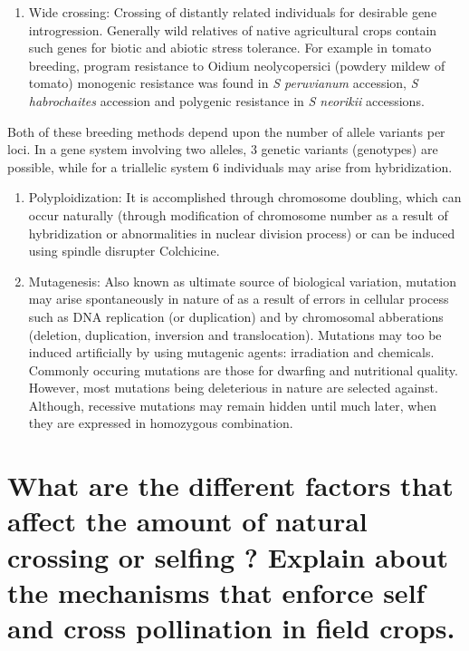 \documentclass[
]{book}
\providecommand{\tightlist}{%
  \setlength{\itemsep}{0pt}\setlength{\parskip}{0pt}}
\begin{document}
\begin{enumerate}
\def\labelenumi{\arabic{enumi}.}
\setcounter{enumi}{1}
\tightlist
\item
  Wide crossing: Crossing of distantly related individuals for desirable gene introgression. Generally wild relatives of native agricultural crops contain such genes for biotic and abiotic stress tolerance. For example in tomato breeding, program resistance to Oidium neolycopersici (powdery mildew of tomato) monogenic resistance was found in \emph{S peruvianum} accession, \emph{S habrochaites} accession and polygenic resistance in \emph{S neorikii} accessions.
\end{enumerate}

Both of these breeding methods depend upon the number of allele variants per loci. In a gene system involving two alleles, 3 genetic variants (genotypes) are possible, while for a triallelic system 6 individuals may arise from hybridization.

\begin{enumerate}
\def\labelenumi{\arabic{enumi}.}
\setcounter{enumi}{2}
\item
  Polyploidization: It is accomplished through chromosome doubling, which can occur naturally (through modification of chromosome number as a result of hybridization or abnormalities in nuclear division process) or can be induced using spindle disrupter Colchicine.
\item
  Mutagenesis: Also known as ultimate source of biological variation, mutation may arise spontaneously in nature of as a result of errors in cellular process such as DNA replication (or duplication) and by chromosomal abberations (deletion, duplication, inversion and translocation). Mutations may too be induced artificially by using mutagenic agents: irradiation and chemicals. Commonly occuring mutations are those for dwarfing and nutritional quality. However, most mutations being deleterious in nature are selected against. Although, recessive mutations may remain hidden until much later, when they are expressed in homozygous combination.
\end{enumerate}

\hypertarget{what-are-the-different-factors-that-affect-the-amount-of-natural-crossing-or-selfing-explain-about-the-mechanisms-that-enforce-self-and-cross-pollination-in-field-crops.}{%
\section{What are the different factors that affect the amount of natural crossing or selfing ? Explain about the mechanisms that enforce self and cross pollination in field crops.}\label{what-are-the-different-factors-that-affect-the-amount-of-natural-crossing-or-selfing-explain-about-the-mechanisms-that-enforce-self-and-cross-pollination-in-field-crops.}}
\end{document}
